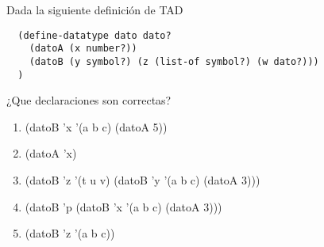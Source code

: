 {
 Dada la siguiente definición de TAD
  \begin{lstlisting}
  (define-datatype dato dato?
    (datoA (x number?))
    (datoB (y symbol?) (z (list-of symbol?) (w dato?)))
  )
  \end{lstlisting}
  ¿Que declaraciones son correctas?
	\begin{enumerate}
	  \item (datoB 'x '(a b c) (datoA 5)) %
    \item (datoA 'x)
    \item (datoB 'z '(t u v) (datoB 'y '(a b c) (datoA 3))) %
    \item (datoB 'p (datoB 'x '(a b c) (datoA 3)))
    \item (datoB 'z '(a b c))
  \end{enumerate}
}
